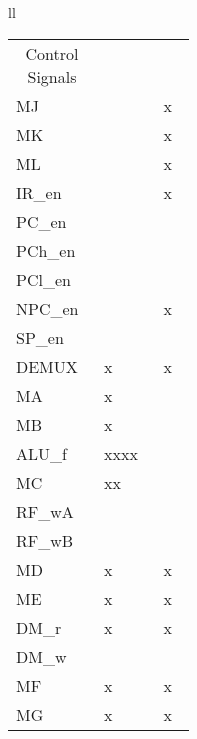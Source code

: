 \documentclass[11pt]{article}
\begin{document}
\begin{enumerate}[leftmargin=0.2in]
\begin{enumerate}
      \begin{table}[H]
        \centering
        \begin{tabular}{ll}
          \begin{tabular}{|p{0.12\linewidth}|>{\centering\arraybackslash}p{0.12\linewidth}|>{\centering\arraybackslash}p{0.12\linewidth}|}\hline
            \multicolumn{1}{|c|}{\multirow{2}{0.12\linewidth}{Control Signals}} & \multicolumn{1}{c|}{\multirow{2}{*}{IF}} & \multicolumn{1}{c|}{\texttt{CLR}} \\ \cline{3-3} 
            \multicolumn{1}{|c|}{} & \multicolumn{1}{c|}{} & \multicolumn{1}{c|}{EX} \\ \hhline{|=|=|=|}
            MJ        & 0     & x     \\ \hline
            MK        & 0     & x     \\ \hline
            ML        & 0     & x     \\ \hline
            IR\_en    & 1     & x     \\ \hline
            PC\_en    & 1     & 0     \\ \hline
            PCh\_en   & 0     & 0     \\ \hline
            PCl\_en   & 0     & 0     \\ \hline
            NPC\_en   & 1     & x     \\ \hline
            SP\_en    & 0     & 0     \\ \hline
            DEMUX     & x     & x     \\ \hhline{|=|=|=|}
            MA        & x     & 1     \\ \hline
            MB        & x     & 0     \\ \hline
            ALU\_f    & xxxx  & 1010  \\ \hline
            MC        & xx    & 00    \\ \hline
            RF\_wA    & 0     & 0     \\ \hline
            RF\_wB    & 0     & 1     \\ \hline
            MD        & x     & x     \\ \hline
            ME        & x     & x     \\ \hline
            DM\_r     & x     & x     \\ \hline
            DM\_w     & 0     & 0     \\ \hline
            MF        & x     & x     \\ \hline
            MG        & x     & x     \\ \hline

\end{tabular}
\end{tabular}
\end{table}
\end{enumerate}
\end{enumerate}
\end{document}
